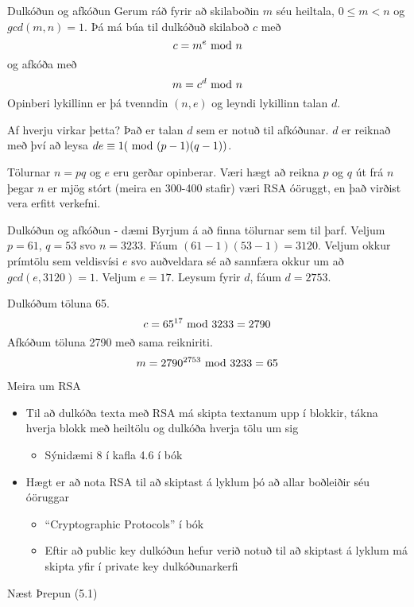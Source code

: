 \documentclass[handout]{beamer}
\begin{document}
\begin{frame}{Dulkóðun og afkóðun}
Gerum ráð fyrir að skilaboðin $m$ séu heiltala, $0 \leq m < n$ og $gcd(m, n) = 1$. Þá má búa til dulkóðuð skilaboð $c$ með
\[
    c = m^e \ \text{mod}\ n
\]
og afkóða með 
\[
    m = c^d \ \text{mod}\ n
\]
Opinberi lykillinn er þá tvenndin $(n, e)$ og leyndi lykillinn talan $d$.

\end{frame}

\begin{frame}{Af hverju virkar þetta?}
Það er talan $d$ sem er notuð til afkóðunar. $d$ er reiknað með því að leysa $de \equiv 1 (\ \text{mod}\ (p-1)(q-1))$.

Tölurnar $n = pq$ og $e$ eru gerðar opinberar. Væri hægt að reikna $p$ og $q$ út frá $n$ þegar $n$ er mjög stórt (meira en 300-400 stafir) væri RSA óöruggt, en það virðist vera erfitt verkefni.
\end{frame}

\begin{frame}{Dulkóðun og afkóðun - dæmi}
Byrjum á að finna tölurnar sem til þarf. Veljum $p=61$, $q = 53$ svo $n = 3233$. Fáum $(61 - 1)(53 - 1) = 3120$. Veljum okkur prímtölu sem veldisvísi $e$ svo auðveldara sé að sannfæra okkur um að $gcd(e,3120)=1$. Veljum $e = 17$. Leysum fyrir $d$, fáum $d = 2753$.

Dulkóðum töluna 65.
\[
 c = 65^{17} \ \text{mod}\ 3233 = 2790
\]
Afkóðum töluna 2790 með sama reikniriti.
\[
 m = 2790^{2753} \ \text{mod}\ 3233 = 65
\]
\end{frame}

\begin{frame}{Meira um RSA}
\begin{itemize}
 \item Til að dulkóða texta með RSA má skipta textanum upp í blokkir, tákna hverja blokk með heiltölu og dulkóða hverja tölu um sig
 \begin{itemize}
  \item Sýnidæmi 8 í kafla 4.6 í bók
 \end{itemize}
 \item Hægt er að nota RSA til að skiptast á lyklum þó að allar boðleiðir séu óöruggar
 \begin{itemize}
  \item ``Cryptographic Protocols'' í bók
  \item Eftir að public key dulkóðun hefur verið notuð til að skiptast á lyklum má skipta yfir í private key dulkóðunarkerfi
 \end{itemize}
\end{itemize}
\end{frame}

\begin{frame}{Næst}
Þrepun (5.1)
\end{frame}
\end{document}
